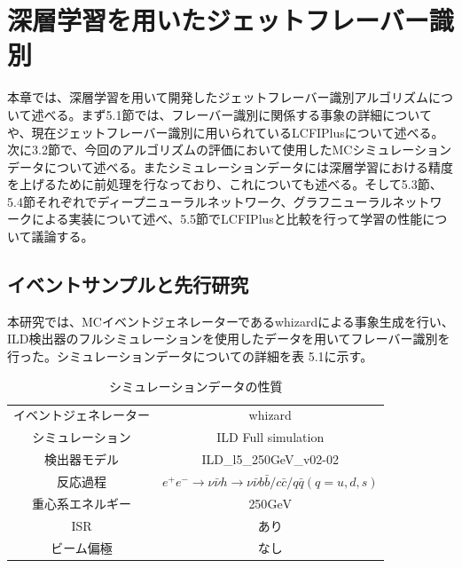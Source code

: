 


\chapter{深層学習を用いたジェットフレーバー識別} \label{sec:Flavortagging}
本章では、深層学習を用いて開発したジェットフレーバー識別アルゴリズムについて述べる。まず5.1節では、フレーバー識別に関係する事象の詳細についてや、現在ジェットフレーバー識別に用いられているLCFIPlusについて述べる。次に3.2節で、今回のアルゴリズムの評価において使用したMCシミュレーションデータについて述べる。またシミュレーションデータには深層学習における精度を上げるために前処理を行なっており、これについても述べる。そして5.3節、5.4節それぞれでディープニューラルネットワーク、グラフニューラルネットワークによる実装について述べ、5.5節でLCFIPlusと比較を行って学習の性能について議論する。
\section{イベントサンプルと先行研究}
本研究では、MCイベントジェネレーターであるwhizardによる事象生成を行い、ILD検出器のフルシミュレーションを使用したデータを用いてフレーバー識別を行った。シミュレーションデータについての詳細を表 5.1に示す。
\begin{table}[H]
 \centering
 \begin{tabular}{ c c }
 \hline
 イベントジェネレーター & whizard\\
 シミュレーション & ILD Full simulation\\
 検出器モデル & ILD\_l5\_250GeV\_v02-02\\
 反応過程 & $e^+e^- \rightarrow \nu \bar{\nu} h \rightarrow \nu \bar{\nu} b \bar{b} / c \bar{c} / q \bar{q} (q = u,d,s)$\\
 重心系エネルギー & 250$\mathrm{GeV}$ \\
 ISR & あり\\
 ビーム偏極 & なし\\
 \hline
  \end{tabular}
  \caption{シミュレーションデータの性質}
\end{table}
